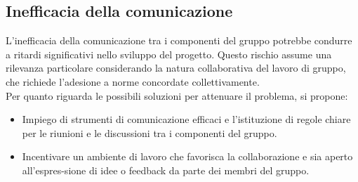 \documentclass{article}
\begin{document}
\subsection{Inefficacia della comunicazione} 
L’inefficacia della comunicazione tra i componenti del gruppo potrebbe condurre a ritardi significativi nello sviluppo del progetto. Questo rischio assume una rilevanza particolare considerando la natura collaborativa del lavoro di gruppo, che richiede l’adesione a norme concordate collettivamente.
\\Per quanto riguarda le possibili soluzioni per attenuare il problema, si propone:
   \begin{itemize} 
    \item Impiego di strumenti di comunicazione efficaci e l’istituzione di regole chiare per le riunioni e le discussioni tra i componenti del gruppo.
    \item Incentivare un ambiente di lavoro che favorisca la collaborazione e sia aperto all'espres-sione di idee o feedback da parte dei membri del gruppo.

\end{itemize}
\end{document}
